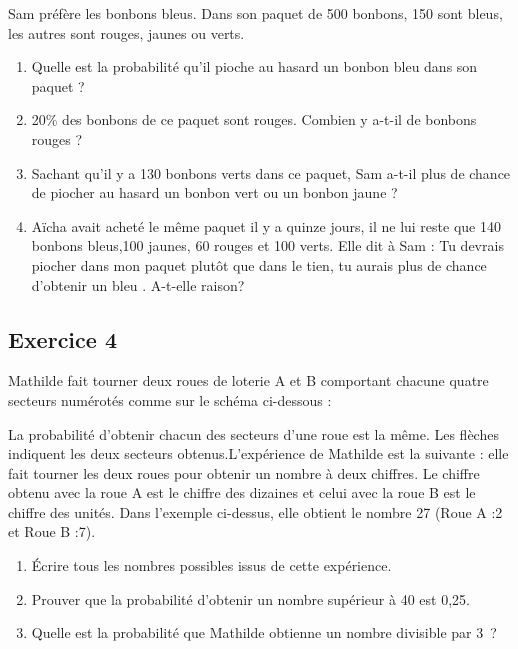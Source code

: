 \documentclass[10pt,a4paper,landscape]{article}
\begin{document}
\begin{multicols}{3}
Sam préfère les bonbons bleus. 
Dans son paquet de 500 bonbons, 150 sont bleus, les autres sont rouges, jaunes ou verts.

\begin{enumerate}
    \item Quelle est la probabilité qu’il pioche au hasard un bonbon bleu dans son paquet ?
    \item 20\% des bonbons de ce paquet sont rouges. Combien y a-t-il de bonbons rouges ?     
    \item Sachant qu’il y a 130 bonbons verts dans ce paquet, Sam a-t-il plus de chance de piocher au hasard un bonbon vert ou un bonbon jaune ?
    \item Aïcha avait acheté le même paquet il y a quinze jours, il ne lui reste que 140 bonbons bleus,100 jaunes, 60 rouges et 100 verts. Elle dit à Sam : \og Tu devrais piocher dans mon paquet plutôt que dans le tien, tu aurais plus de chance d’obtenir un bleu \fg.
A-t-elle raison? 
\end{enumerate}

\subsection*{Exercice 4}

Mathilde fait tourner deux roues de loterie A et B comportant chacune quatre secteurs numérotés comme sur le schéma ci-dessous : 


La probabilité d’obtenir chacun des secteurs d’une roue est la même. Les flèches indiquent les deux secteurs obtenus.L’expérience de Mathilde est la suivante : elle fait tourner les deux roues pour obtenir un nombre à deux chiffres. Le chiffre obtenu avec la roue A est le chiffre des dizaines et celui avec la roue B est le chiffre des unités. Dans l’exemple ci-dessus, elle obtient le nombre 27 (Roue A :2 et Roue B :7).

\begin{enumerate}
    \item Écrire tous les nombres possibles issus de cette expérience.
    \item Prouver que la probabilité d’obtenir un nombre supérieur à 40 est 0,25.
    \item Quelle est la probabilité que Mathilde obtienne un nombre divisible par 3 ?
\end{enumerate}

\end{multicols}
\end{document}
